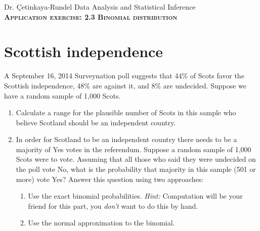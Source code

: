 \documentclass[11pt]{article}
\newcommand{\ttl}[1]{ \textsc{{\LARGE \textbf{{\color{oiB} #1} } }}}
\begin{document}
Dr. \c{C}etinkaya-Rundel \hfill Data Analysis and Statistical Inference \\

\ttl{Application exercise: 2.3 Binomial distribution} 

\section*{Scottish independence}

A September 16, 2014 Surveynation poll suggests that 44\% of Scots favor the Scottish independence, 48\% are against it, and 8\% are undecided. Suppose we have a random sample of 1,000 Scots.

\begin{enumerate}

\item Calculate a range for the plausible number of Scots in this sample who believe Scotland should be an independent country.

\item In order for Scotland to be an independent country there needs to be a majority of Yes votes in the referendum. Suppose a random sample of 1,000 Scots were to vote. Assuming that all those who said they were undecided on the poll vote No, what is the probability that majority in this sample (501 or more) vote Yes? Answer this question using two approaches:
\begin{enumerate}
\item Use the exact binomial probabilities. \textit{Hint:} Computation will be your friend for this part, you \textit{don't} want to do this by hand.
\item Use the normal approximation to the binomial.
\end{enumerate}



\end{enumerate}
\end{document}

